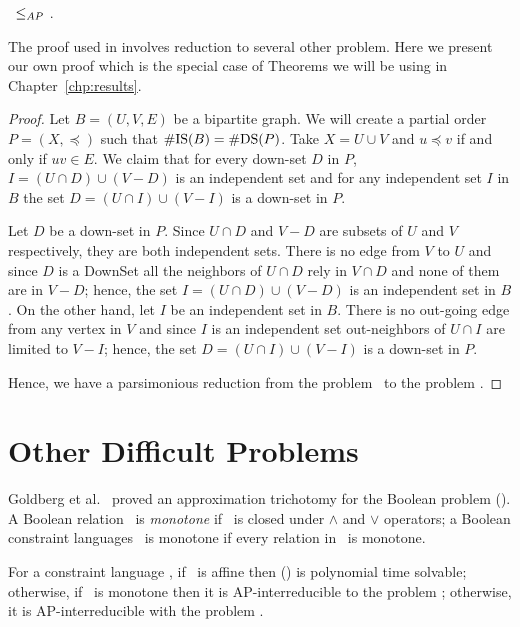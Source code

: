 \begin{lemma} \label{lem:bistods}
\cbis\ \(\le_{AP}\) \cdsp\@.
\end{lemma}

The proof used in \cite{counting} involves reduction to several other problem. Here 
we present our own proof which is the special case of Theorems we will be using in
Chapter~\ref{chp:results}\@.

\begin{proof}
Let \(B=(U,V,E)\) be a bipartite graph. We will create a partial order \(P=(X,\preceq)\)
such that \(\#\mathrm{IS}(B)=\#\mathrm{DS}(P)\)\@. Take \(X=U \cup V\) and \(u \preceq v\) if and only if
\(uv \in E\)\@. We claim that for every down-set \(D\) in \(P\), 
\(I=(U\cap D) \cup (V - D)\) is an independent set and for any independent set
\(I\) in \(B\) the set \(D=(U \cap I) \cup (V - I)\) is a down-set in \(P\)\@.

Let \(D\) be a down-set in \(P\)\@. Since \(U\cap D\) and \(V - D\) are subsets of
\(U\) and \(V\) respectively, they are both independent sets.
There is no edge from \(V\) to \(U\) and since \(D\) is a DownSet
all the neighbors of \(U\cap D\) rely in \(V\cap D\)
and none of them are in \(V - D\); hence, the set \(I=(U\cap D) \cup (V - D)\) is
an independent set in \(B\)\@. On the other hand, let \(I\) be an independent set in \(B\)\@.
There is no out-going edge from any vertex in \(V\) and since \(I\) is an independent set
out-neighbors of \(U\cap I\) are limited to \(V - I\); hence, the set \(D=(U \cap I) \cup (V - I)\) is
a down-set in \(P\)\@.

Hence, we have a parsimonious reduction from the problem \cbis\ to the problem \cdsp\@.
\end{proof}

\section{Other Difficult Problems} \label{sec:other}
Goldberg et al.~\cite{Trichotomy} proved an approximation trichotomy for the Boolean problem
\ccsp(\mrelset). A Boolean relation \mR\ is \emph{monotone} if \mR\ is closed under
\(\land\) and \(\lor\) operators; a Boolean constraint languages \mrelset\ is monotone if 
every relation in \mrelset\ is monotone.


\begin{theorem} \label{thrm:trichotomy}
For a constraint language \mrelset,
if \mrelset\ is affine then \ccsp(\mrelset) is polynomial time solvable; otherwise,
if \mrelset\ is monotone then it is AP-interreducible to the problem \cbis; otherwise,
it is AP-interreducible with the problem \csat\@.
\end{theorem}

